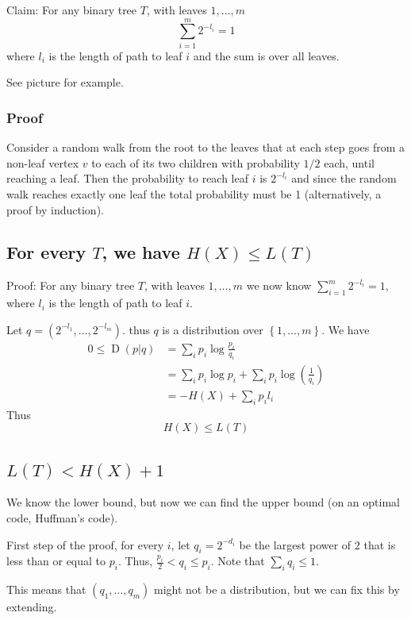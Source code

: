 \documentclass{article}
\begin{document}
Claim: For any binary tree $T$, with leaves $1,\ldots,m$
\[
\sum_{i=1 }^{m }2^{-l_i}=1
\]
where $l_i$ is the length of path to leaf $i$ and the sum is over all leaves.

See picture for example.

\subsubsection{Proof}

Consider a random walk from the root to the leaves that at each step goes from a non-leaf vertex $v$ to each of its two children with probability $1/2$ each, until reaching a leaf. Then the probability to reach leaf $i$ is $2^{-l_i}$ and since the random walk reaches exactly one leaf the total probability must be 1 (alternatively, a proof by induction).

\subsection{For every $T$, we have $H(X)\leq L(T)$}

Proof: For any binary tree $T$, with leaves $1,\ldots, m$ we now know $\sum_{i=1 }^{m }2^{-l_i}=1$, where $l_i$ is the length of path to leaf $i$. 

Let $q=\left(2^{-l_1}, \ldots, 2^{-l_m}\right)$. thus $q$ is a distribution over $\left\{1,\ldots, m\right\}$. We have 
\begin{align*}
    0\leq \operatorname{D}\left(p\vert q\right)&=\sum_i p_i\log\frac{p_i }{q_i}\\
    &= \sum_i p_i \log p_i + \sum_i p_i \log \left(\frac{1 }{q_i}\right)\\
    &= -H(X) +\sum_i p_i l_i
\end{align*}
Thus 
\[
H(X) \leq L(T)
\]

\subsection{$L(T) < H(X) +1 $}

We know the lower bound, but now we can find the upper bound (on an optimal code, Huffman's code).

First step of the proof, for every $i$, let $q_i=2^{-d_i}$ be the largest power of $2$ that is less than or equal to $p_i$. Thus, $\frac{p_i}{2}< q_i\leq p_i$. Note that $\sum_i q_i \leq 1$.

This means that $\left(q_1,\ldots,q_m\right)$ might not be a distribution, but we can fix this by extending.
\end{document}

